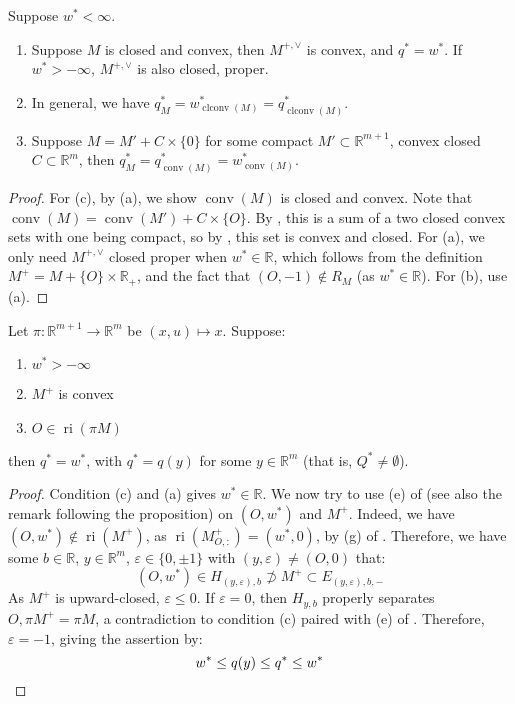 \begin{coro}\label{coro:032-reachability-special-cases}Suppose $w^\ast<\infty$.
	\begin{enumerate}[label=(\alph*)]
		\item Suppose $M$ is closed and convex, then $M^{+,\vee}$ is convex, and $q^\ast=w^\ast$. If $w^\ast > -\infty$, $M^{+,\vee}$ is also closed, proper.
		\item In general, we have $q_M^\ast = w_{\operatorname{clconv}(M)}^\ast = q_{\operatorname{clconv}(M)}^\ast$.
		\item Suppose $M=M'+C\times \{0\}$ for some compact $M'\subset \mathbb{R}^{m+1}$, convex closed $C\subset \mathbb{R}^m$, then $q^\ast_{M}=q^\ast_{\operatorname{conv}(M)}=w^\ast_{\operatorname{conv}(M)}$.
	\end{enumerate}
\end{coro}
\begin{proof}
	For (c), by (a), we show $\operatorname{conv}(M)$ is closed and convex. Note that $\operatorname{conv}(M)=\operatorname{conv}(M')+C\times \{O\}$. By , this is a sum of a two closed convex sets with one being compact, so by , this set is convex and closed. For (a), we only need $M^{+,\vee}$ closed proper when $w^\ast\in \mathbb{R}$, which follows from the definition $M^+=M+\{O\}\times \mathbb{R}_{+}$, and the fact that $(O, -1)\notin R_M$ (as $w^\ast \in \mathbb{R}$). For (b), use (a).
\end{proof}

\begin{prop}\label{prop:032-reachability}
	Let $\pi :\mathbb{R}^{m+1}\to \mathbb{R}^m$ be $(x,u)\mapsto x$. Suppose:
	\begin{enumerate}[label=(\alph*)]
		\item $w^\ast >-\infty$
		\item $M^+$ is convex
		\item $O\in \operatorname{ri}(\pi M)$
	\end{enumerate}
	then $q^\ast=w^\ast$, with $q^\ast=q(y)$ for some $y\in \mathbb{R}^m$ (that is, $Q^\ast\neq\emptyset$).
\end{prop}
\begin{proof}
	Condition (c) and (a) gives $w^\ast \in \mathbb{R}$. We now try to use (e) of  (see also the remark following the proposition) on $(O, w^\ast)$ and $M^+$. Indeed, we have $(O, w^\ast)\notin \operatorname{ri}(M^+)$, as $\operatorname{ri}(M^+_{O,:})=(w^\ast,0)$, by (g) of . Therefore, we have some $b\in \mathbb{R}$, $y\in \mathbb{R}^m$, $\varepsilon \in \{0,\pm 1\}$ with $(y,\varepsilon )\neq (O,0)$ that:
	\[
		(O,w^\ast)\in H_{(y,\varepsilon),b}\nsupset M^+ \subset E_{(y,\varepsilon ),b,-}
	\]
	As $M^+$ is upward-closed, $\varepsilon\leq 0$. If $\varepsilon =0$, then $H_{y,b}$ properly separates $O,\pi M^+=\pi M$, a contradiction to condition (c) paired with (e) of . Therefore, $\varepsilon =-1$, giving the assertion by:
	\[
		w^\ast \leq q(y) \leq q^\ast \leq w^\ast \qedhere
	\]
\end{proof}


